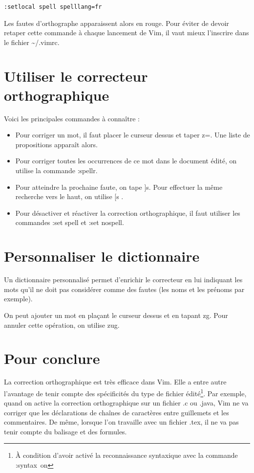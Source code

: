 \documentclass{article}
\begin{document}
\begin{verbatim}
:setlocal spell spelllang=fr
\end{verbatim}

Les fautes d'orthographe apparaissent alors en rouge. Pour éviter de devoir
retaper cette commande à chaque lancement de Vim, il vaut mieux l'inscrire dans
le fichier \textasciitilde{}/.vimrc.


\section{Utiliser le correcteur orthographique}
Voici les principales commandes à connaître :
\begin{itemize}
    \item Pour corriger un mot, il faut placer le curseur dessus et taper
        \og{}z=\fg{}. Une liste de propositions apparaît alors.
    \item Pour corriger toutes les occurrences de ce mot dans le document
        édité, on utilise la commande \og{}:spellr\fg{}.
    \item Pour atteindre la prochaine faute, on tape \og{}]s\fg{}. Pour
        effectuer la même recherche vers le haut, on utilise \og [s \fg.
    \item Pour désactiver et réactiver la correction orthographique, il faut
        utiliser les commandes \og{}:set spell\fg{} et \og{}:set nospell\fg{}.
\end{itemize}


\section{Personnaliser le dictionnaire}
Un dictionnaire personnalisé permet d'enrichir le correcteur en lui indiquant
les mots qu'il ne doit pas considérer comme des fautes (les noms et les prénoms
par exemple).

On peut ajouter un mot en plaçant le curseur dessus et en tapant \og{}zg\fg{}.
Pour annuler cette opération, on utilise \og{}zug\fg{}.


\section{Pour conclure}
La correction orthographique est très efficace dans Vim. Elle a entre autre
l'avantage de tenir compte des spécificités du type de fichier
édité\footnote{À condition d'avoir activé la reconnaissance syntaxique avec
la commande \og{}:syntax~on\fg{}}. Par exemple, quand on active la correction
orthographique sur un fichier .c ou .java, Vim ne va corriger que les
déclarations de chaînes de caractères entre guillemets et les commentaires. De
même, lorsque l'on travaille avec un fichier .tex, il ne va pas tenir compte du
balisage et des formules.
\end{document}
